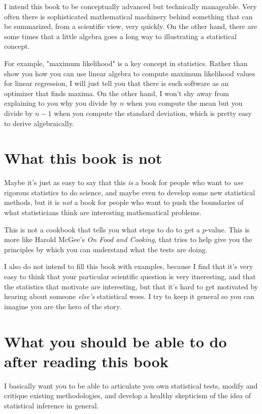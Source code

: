I intend this book to be conceptually advanced but technically manageable. Very
often there is sophisticated mathematical machinery behind something that can
be summarized, from a scientific view, very quickly. On the other hand, there
are some times that a little algebra goes a long way to illustrating a
statistical concept.

For example, "maximum likelihood" is a key concept in statistics. Rather than
show you how you can use linear algebra to compute maximum likelihood values
for linear regression, I will just tell you that there is such software as an
optimizer that finds maxima. On the other hand, I won't shy away from
explaining to you why you divide by $n$ when you compute the mean but you
divide by $n-1$ when you compute the standard deviation, which is pretty easy
to derive algebraically.

\section*{What this book is not}

Maybe it's just as easy to say that this \emph{is} a book for people who want
to \emph{use} rigorous statistics to do science, and maybe even to develop some
new statistical methods, but it is \emph{not} a book for people who want to
push the boundaries of what statisticians think are interesting mathematical
problems.

This is not a cookbook that tells you what steps to do to get a $p$-value. This
is more like Harold McGee's \textit{On Food and Cooking}, that tries to help
give you the principles by which you can understand what the tests are doing.

I also do not intend to fill this book with examples, because I find that it's
very easy to think that your particular scientific question is very
itneresting, and that the statistics that motivate are interesting, but that
it's hard to get motivated by hearing about someone \emph{else's} statistical
woes. I try to keep it general so you can imagine you are the hero of the story.

\section*{What you should be able to do after reading this book}

I basically want you to be able to articulate you own statistical tests, modify
and critique existing methodologies, and develop a healthy skepticism of the
idea of statistical inference in general.

